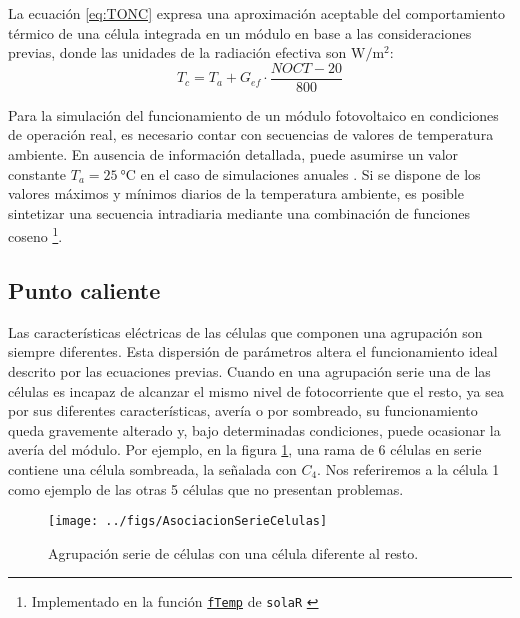 La ecuación \ref{eq:TONC} expresa una aproximación aceptable del
comportamiento térmico de una célula integrada en un módulo en base
a las consideraciones previas, donde las unidades de la radiación
efectiva son $\si{\watt\per\meter\squared}$:
\begin{equation}
  T_{c}=T_{a}+G_{ef}\cdot\frac{NOCT-20}{800}\label{eq:TONC}
\end{equation}

Para la simulación del funcionamiento de un módulo fotovoltaico en
condiciones de operación real, es necesario contar con secuencias de
valores de temperatura ambiente. En ausencia de información detallada,
puede asumirse un valor constante $T_a=\SI{25}{\celsius}$ en el caso
de simulaciones anuales \cite{Perpinan.Lorenzo.ea2007}. Si se dispone
de los valores máximos y mínimos diarios de la temperatura ambiente,
es posible sintetizar una secuencia intradiaria mediante una
combinación de funciones coseno
\cite{Huld.Suri.ea2006}\footnote{Implementado en la función
  \href{http://search.r-project.org/R/library/solaR/html/fTemp.html}{\texttt{fTemp}}
  de \texttt{solaR} \cite{Perpinan2012b}}.

\subsection{Punto caliente}

\nocite{Alonso-Garcia.Ruiz.ea2006,Alonso-Garcia.Herrmann.ea2003,Alonso-Garcia2005}

Las características eléctricas de las células que componen una agrupación
son siempre diferentes. Esta dispersión de parámetros altera el funcionamiento
ideal descrito por las ecuaciones previas. Cuando en una agrupación
serie una de las células es incapaz de alcanzar el mismo nivel de
fotocorriente que el resto, ya sea por sus diferentes características,
avería o por sombreado, su funcionamiento queda gravemente alterado
y, bajo determinadas condiciones, puede ocasionar la avería del módulo.
Por ejemplo, en la figura \ref{fig:CelulaSombreada}, una rama de
6 células en serie contiene una célula sombreada, la señalada con
$C_{4}$. Nos referiremos a la célula 1 como ejemplo de las otras
5 células que no presentan problemas. 


\begin{figure}
\begin{centering}
\texttt{[image: ../figs/AsociacionSerieCelulas]}
\end{centering}

\caption{Agrupación serie de células con una célula diferente al resto.\label{fig:CelulaSombreada}}

\end{figure}

